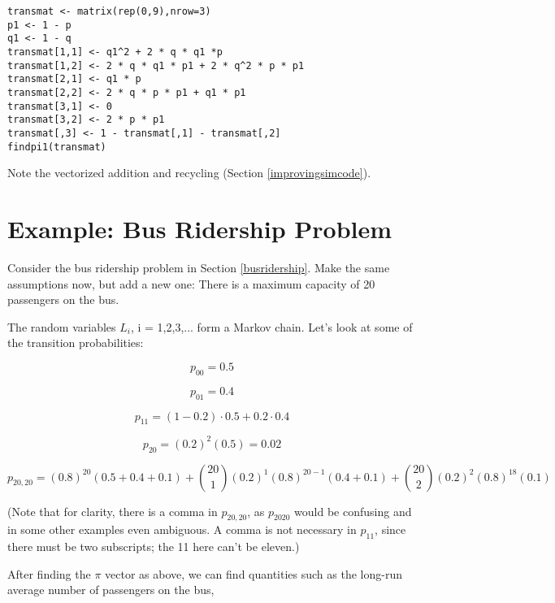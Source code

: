 \begin{Verbatim}[fontsize=\relsize{-2}]
transmat <- matrix(rep(0,9),nrow=3)
p1 <- 1 - p
q1 <- 1 - q
transmat[1,1] <- q1^2 + 2 * q * q1 *p
transmat[1,2] <- 2 * q * q1 * p1 + 2 * q^2 * p * p1
transmat[2,1] <- q1 * p
transmat[2,2] <- 2 * q * p * p1 + q1 * p1
transmat[3,1] <- 0
transmat[3,2] <- 2 * p * p1
transmat[,3] <- 1 - transmat[,1] - transmat[,2]
findpi1(transmat)
\end{Verbatim}

Note the vectorized addition and recycling (Section
\ref{improvingsimcode}). 

\section{Example:  Bus Ridership Problem}

Consider the bus ridership problem in Section \ref{busridership}.  Make
the same assumptions now, but add a new one:  There is a maximum
capacity of 20 passengers on the bus.

The random variables $L_i$, i = 1,2,3,... form a Markov chain.  Let's
look at some of the transition probabilities:

\begin{equation}
p_{00} = 0.5 
\end{equation}

\begin{equation}
p_{01} = 0.4 
\end{equation}

\begin{equation}
p_{11} = (1-0.2) \cdot 0.5 + 0.2 \cdot 0.4
\end{equation}

\begin{equation}
p_{20} = (0.2)^2 (0.5) = 0.02
\end{equation}

\begin{equation}
p_{20,20} = (0.8)^{20} (0.5+0.4+0.1) + 
\binom{20}{1}
(0.2)^1 (0.8)^{20-1} (0.4 + 0.1) + 
\binom{20}{2}
(0.2)^2 (0.8)^{18} (0.1)
\end{equation}

(Note that for clarity, there is a comma in $p_{20,20}$, as $p_{2020}$
would be confusing and in some other examples even ambiguous.  A comma
is not necessary in $p_{11}$, since there must be two subscripts; the 11
here can't be eleven.)

After finding the $\pi$ vector as above, we can find quantities such as
the long-run average number of passengers on the bus,

